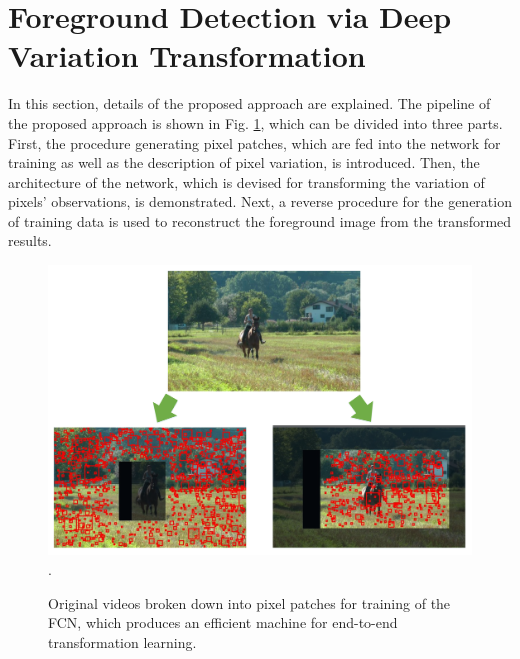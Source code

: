 \documentclass[journal]{IEEEtran}
\newcommand{\reffig}[1]{Fig. \ref{#1}}
\DeclareMathOperator*{\argmin}{argmin}
\begin{document}



\section{Foreground Detection via Deep Variation Transformation}
\label{sec4}
In this section, details of the proposed approach are explained.
%
The pipeline of the proposed approach is shown in \reffig{flow_chart},
which can be divided into three parts.
%
First, the procedure generating pixel patches,
which are fed into the network for training as well as the description of pixel variation,
is introduced.
%
Then,
the architecture of the network, which is devised for transforming the variation of pixels' observations, is demonstrated.
%
Next,
a reverse procedure for the generation of training data is used to reconstruct the foreground image from the transformed results.
%
%

\begin{figure}[!t] %
\centering
\includegraphics[width=\textwidth]{figure/fig2}
\DeclareGraphicsExtensions.
    \caption{ Original videos broken down into pixel patches for training of the FCN, which 
produces an efficient machine for end-to-end transformation learning.}
    \label{flow_chart}
\end{figure}
\end{document}

